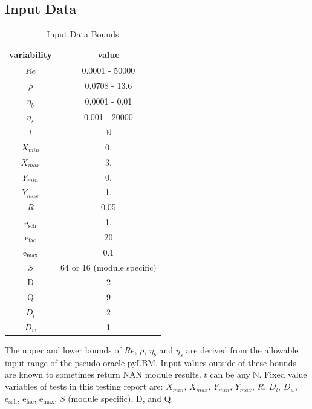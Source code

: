 \documentclass[12pt, titlepage]{article}
\begin{document}

~\newpage
\subsection{Input Data}
\label{inputdata}

\begin{table}[!h]
\begin{center}
\begin{tabular}{| c | c |}
\hline
\textbf{variability} & \textbf{value}\\
\hline
$Re$& 0.0001 - 50000\\
\hline
$\rho$ & 0.0708 - 13.6\\
\hline
$\eta_b$ & 0.0001 - 0.01\\
\hline
$\eta_s$ & 0.001 - 20000\\
\hline
$t$ & $\mathbb{N}$\\
\hline
$X_{min}$ & 0.\\
\hline
$X_{max}$ & 3.\\
\hline
$Y_{min}$ & 0.\\
\hline
$Y_{max}$ & 1.\\
\hline
$R$ & 0.05\\
\hline
$\mathrm{e_{sch}}$ & 1.\\
\hline
$\mathrm{e_{fac}}$ & 20\\
\hline
$\mathrm{e_{max}}$ & 0.1\\
\hline
$S$ & 64 or 16 (module specific)\\
\hline
$\mathrm{D}$ & 2\\
\hline
$\mathrm{Q}$ & 9\\
\hline
$D_{l}$ & 2\\
\hline
$D_{w}$ & 1\\
\hline
\end{tabular}
\caption{Input Data Bounds}
\label{table:inputdatabounds}
\end{center}
\end{table}


\noindent The upper and lower bounds of $Re$, $\rho$, $\eta_b$ and $\eta_s$ are
derived from the allowable input range of the pseudo-oracle pyLBM. Input values
outside of these bounds are known to sometimes return NAN module results. $t$
can be any $\mathbb{N}$. Fixed value variables of tests in this testing report
are: $X_{min}$, $X_{max}$, $Y_{min}$, $Y_{max}$, $R$, $D_{l}$, $D_{w}$,
$\mathrm{e_{sch}}$, $\mathrm{e_{fac}}$, $\mathrm{e_{max}}$, $S$ (module
specific), $\mathrm{D}$, and $\mathrm{Q}$.
\end{document}
